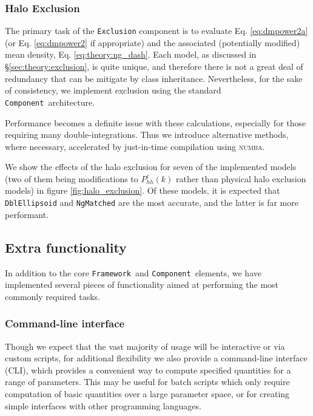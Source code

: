 \documentclass[5p,aas_macros]{elsarticle}
\newcommand{\framework}{\texttt{Framework}}
\newcommand{\component}{\texttt{Component}}
\begin{document}
\subsubsection{Halo Exclusion}
\label{sec:halomod:components:exclusion}
The primary task of the \verb|Exclusion| component is to evaluate Eq. \ref{eq:dmpower2a} (or Eq. \ref{eq:dmpower2} if appropriate) and the associated (potentially modified) mean density, Eq. \ref{eq:theory:ng_dash}. Each model, as discussed in \S\ref{sec:theory:exclusion}, is quite unique, and therefore there is not a great deal of redundancy that can be mitigate by class inheritance.
Nevertheless, for the sake of consistency, we implement exclusion using the standard \component\ architecture.

Performance becomes a definite issue with these calculations, especially for those requiring many double-integrations. Thus we introduce alternative methods, where necessary, accelerated by just-in-time compilation using \textsc{numba}. 

We show the effects of the halo exclusion for seven of the implemented models (two of them being modifications to $P_{hh}^c(k)$ rather than physical halo exclusion models) in figure \ref{fig:halo_exclusion}. 
Of these models, it is expected that \verb|DblEllipsoid| and \verb|NgMatched| are the most accurate, and the latter is far more performant.


\subsection{Extra functionality}
\label{sec:halomod:extra}
In addition to the core \framework\ and \component\ elements, we have implemented several pieces of functionality aimed at performing the most commonly required tasks.

\subsubsection{Command-line interface}
\label{sec:halomod:extra:cli}
Though we expect that the vast majority of usage will be interactive or via custom scripts, for additional flexibility we also provide a command-line interface (CLI), which provides a convenient way to compute specified quantities for a range of parameters. This may be useful for batch scripts which only require computation of basic quantities over a large parameter space, or for creating simple interfaces with other programming languages. 
\end{document}
